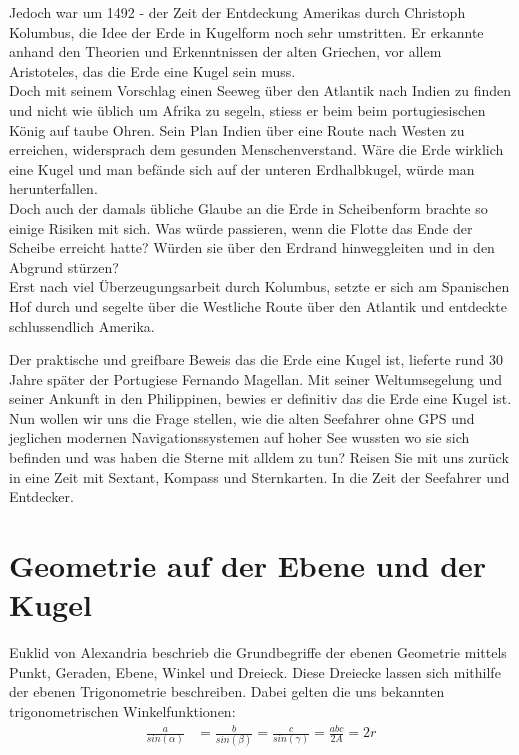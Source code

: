 \begin{refsection}
Jedoch war um 1492 - der Zeit der Entdeckung Amerikas durch Christoph Kolumbus, die Idee der Erde in Kugelform noch sehr umstritten. Er erkannte anhand den Theorien und Erkenntnissen der alten Griechen, vor allem Aristoteles, das die Erde eine Kugel sein muss. \\
Doch mit seinem Vorschlag einen Seeweg über den Atlantik nach Indien zu finden und nicht wie üblich um Afrika zu segeln, stiess er beim beim portugiesischen König auf taube Ohren. Sein Plan Indien über eine Route nach Westen zu erreichen, widersprach dem gesunden Menschenverstand. Wäre die Erde wirklich eine Kugel und man befände sich auf der unteren Erdhalbkugel, würde man herunterfallen.\\
Doch auch der damals übliche Glaube an die Erde in Scheibenform brachte so einige Risiken mit sich. Was würde passieren, wenn die Flotte das Ende der Scheibe erreicht hatte? Würden sie über den Erdrand hinweggleiten und in den Abgrund stürzen?\\
Erst nach viel Überzeugungsarbeit durch Kolumbus, setzte er sich am Spanischen Hof durch und segelte über die Westliche Route über den Atlantik und entdeckte schlussendlich Amerika.

Der praktische und greifbare Beweis das die Erde eine Kugel ist, lieferte rund 30 Jahre später der Portugiese Fernando Magellan. Mit seiner Weltumsegelung und seiner Ankunft in den Philippinen, bewies er definitiv das die Erde eine Kugel ist.\\

Nun wollen wir uns die Frage stellen, wie die alten Seefahrer ohne GPS und jeglichen modernen Navigationssystemen auf hoher See wussten wo sie sich befinden und was haben die Sterne mit alldem zu tun? Reisen Sie mit uns zurück in eine Zeit mit Sextant, Kompass und Sternkarten. In die Zeit der Seefahrer und Entdecker.


\section{Geometrie auf der Ebene und der Kugel}

Euklid von Alexandria beschrieb die Grundbegriffe der ebenen Geometrie mittels Punkt, Geraden, Ebene, Winkel und Dreieck. Diese Dreiecke lassen sich mithilfe der ebenen Trigonometrie beschreiben. Dabei gelten die uns bekannten trigonometrischen Winkelfunktionen:\\

\begin{align*}
\frac{ a }{ sin(\alpha) } &= \frac{ b }{sin(\beta)} = \frac{ c }{ sin(\gamma) } = \frac{abc}{2A} = 2r\\
\end{align*}


\end{refsection}

